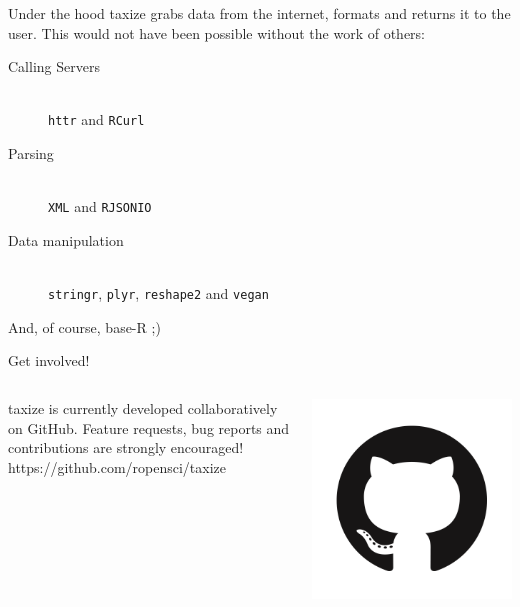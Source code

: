 \documentclass[final,t]{beamer}\usepackage[]{graphicx}\usepackage[]{color}
\begin{document}
\begin{frame}[fragile]
\begin{columns}[t]
\begin{column}{.49\linewidth}
      \begin{block}{Under the hood}
      taxize grabs data from the internet, formats and returns it to the user.
      This would not have been possible without the work of others:
      \begin{description}
        \item[Calling Servers] \hfill \\
          \texttt{httr} and \texttt{RCurl}
        \item[Parsing] \hfill \\
          \texttt{XML} and \texttt{RJSONIO}
        \item[Data manipulation] \hfill \\
          \texttt{stringr}, \texttt{plyr}, \texttt{reshape2} and \texttt{vegan}
      \end{description}
      \vspace{0.5cm}
      And, of course, base-R ;)
      
      \end{block}
      
			\begin{block}{Get involved!}
				\begin{columns}[T]
					\begin{column}{.78\linewidth}
						taxize is currently developed collaboratively on GitHub. Feature requests, bug reports and contributions are strongly encouraged! \\[0.5em]
						\huge \Mundus \normalsize \hspace{0.5cm} https://github.com/ropensci/taxize
					\end{column}
					\begin{column}{.2\linewidth}
						\includegraphics[width=0.85\linewidth]{fig/github.png}
					\end{column}
				\end{columns}
			\end{block}
		\end{column}
	\end{columns}
\end{frame}
\end{document}
